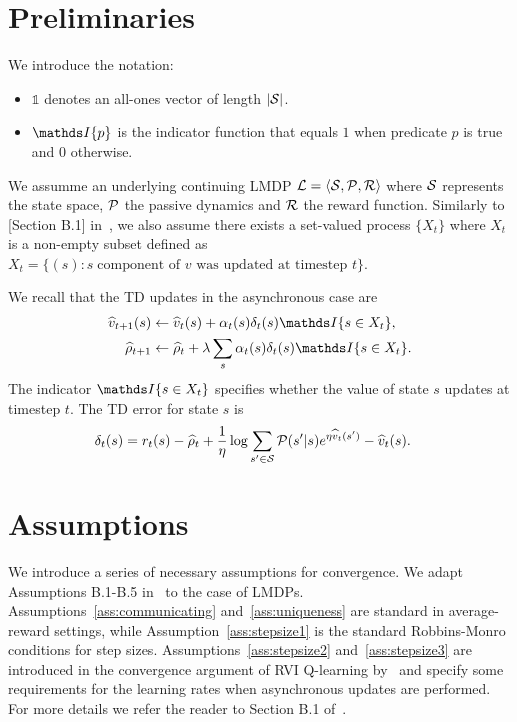 \label{proof:theo_almdps}
\section{Preliminaries}
We introduce the notation:
\begin{itemize}
    \item $\mathds{1}$ denotes an all-ones vector of length $\lvert\mathcal{S}\rvert$.
    \item $\indicator{p}$ is the indicator function that equals $1$ when predicate $p$ is true and $0$ otherwise.
\end{itemize}

We assumme an underlying continuing LMDP $\mathcal{L}=\langle\mathcal{S},\mathcal{P},\mathcal{R}\rangle$ where $\mathcal{S}$ represents the state space, $\mathcal{P}$ the passive dynamics and $\mathcal{R}$ the reward function. Similarly to [Section B.1] in~\cite{Wan2021}, we also assume there exists a set-valued process $\{X_t\}$ where $X_t$ is a non-empty subset defined as ${X_t = \{ (s) : s\;\text{component of $v$ was updated at timestep $t$} \}}$.

We recall that the TD updates in the asynchronous case are 
\begin{align}
\widehat{v}_{t+1}(s) &\gets \widehat{v}_t(s) + \alpha_t(s) \delta_t(s) \indicator{s\in X_t},\label{eq:updatev}\\
\widehat{\rho}_{t+1} &\gets \widehat{\rho}_t + \lambda \sum_s \alpha_t(s) \delta_t(s) \indicator{s\in X_t}.\label{eq:updaterho}
\end{align}
The indicator $\indicator{s\in X_t}$ specifies whether the value of state $s$ updates at timestep $t$. The TD error for state $s$ is
\begin{align*}
\delta_t(s) %
 &= r_t(s) - \widehat{\rho}_t + \frac 1 \eta \log \sum_{s'\in\cS} \cP(s'|s) e^{\eta \widehat{v}_t(s')} - \widehat{v}_t(s).
\end{align*}
\section{Assumptions}
We introduce a series of necessary assumptions for convergence. We adapt Assumptions B.1-B.5 in~\cite{Wan2021} to the case of LMDPs. Assumptions~\ref{ass:communicating} and~\ref{ass:uniqueness} are standard in average-reward settings, while Assumption~\ref{ass:stepsize1} is the standard Robbins-Monro conditions for step sizes. Assumptions~\ref{ass:stepsize2} and~\ref{ass:stepsize3} are introduced in the convergence argument of RVI Q-learning by~\citet{Borkar1998} and specify some requirements for the learning rates when asynchronous updates are performed. For more details we refer the reader to Section B.1 of~\cite{Wan2021}.

